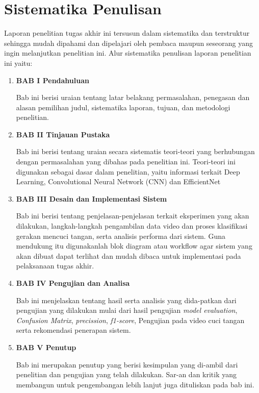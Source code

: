 \newpage
\section{Sistematika Penulisan}
\label{sec:sistematikapenulisan}

Laporan penelitian tugas akhir ini tersusun dalam sistematika dan terstruktur sehingga mudah dipahami dan dipelajari oleh pembaca maupun seseorang yang ingin melanjutkan penelitian ini. Alur sistematika penulisan laporan penelitian ini yaitu:

\begin{enumerate}[nolistsep]

  \item \textbf{BAB I Pendahuluan}

  Bab ini berisi uraian tentang latar belakang permasalahan, penegasan dan alasan pemilihan judul, sistematika laporan, tujuan, dan metodologi penelitian.
  
  \vspace{2ex}

  \item \textbf{BAB II Tinjauan Pustaka}

  Bab ini berisi tentang uraian secara sistematis teori-teori yang berhubungan dengan permasalahan yang dibahas pada penelitian ini. Teori-teori ini digunakan sebagai dasar dalam penelitian, yaitu informasi terkait Deep Learning, Convolutional Neural Network (CNN) dan EfficientNet

  \vspace{2ex}

  \item \textbf{BAB III Desain dan Implementasi Sistem}

  Bab ini berisi tentang penjelasan-penjelasan terkait eksperimen yang akan dilakukan, langkah-langkah pengambilan data video dan proses klasifikasi gerakan mencuci tangan, serta analisis performa dari sistem. Guna mendukung itu digunakanlah blok diagram atau workﬂow agar sistem yang akan dibuat dapat terlihat dan mudah dibaca untuk implementasi pada pelaksanaan tugas akhir.

  \vspace{2ex}

  \item \textbf{BAB IV Pengujian dan Analisa}

  Bab ini menjelaskan tentang hasil serta analisis yang dida-patkan dari pengujian yang dilakukan mulai dari hasil pengujian \emph{model evaluation}, \textit{Confusion Matrix}, \textit{precission}, \textit{f1-score}, Pengujian pada video cuci tangan serta rekomendasi penerapan sistem.

  \vspace{2ex}

  \item \textbf{BAB V Penutup}

  Bab ini merupakan penutup yang berisi kesimpulan yang di-ambil dari penelitian dan pengujian yang telah dilakukan. Sar-an dan kritik yang membangun untuk pengembangan lebih lanjut juga dituliskan pada bab ini.

\end{enumerate}
